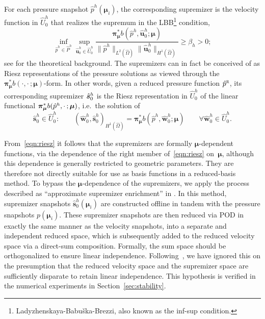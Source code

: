 \documentclass[onecolumn, twoside, a4paper, 11pt]{article}
\begin{document}
For each pressure snapshot $\hat{p}^h(\bm{\mu}_i)$, the corresponding supremizer is the
velocity function in $\hat{U}^h_0$ that realizes the supremum in the
LBB\footnote{Ladyzhenskaya-Babu\v{s}ka-Brezzi, also known as the inf-sup condition.} condition,
%
\begin{equation}
  \label{eqn:lbb}
  \inf_{\hat{p}^h \in \hat{P}^h} \sup_{\hat{\bm u}_0^h \in \hat{U}_0^h}
  \frac{\bm{\pi}^*_{\bm{\mu}}b(\hat{p}^h, \hat{\bm u}^h_0; \bm \mu)}
  {\|\hat{p}^h\|_{L^2(\hat{\Omega})} \|\hat{\bm{u}}_0^h\|_{H^1(\hat{\Omega})}}
  \geq \beta_h > 0;
\end{equation}
%
see \cite{Ballarin2015ssp} for the theoretical background.
%
The supremizers can in fact be conceived of as Riesz representations of the pressure solutions as
viewed through the $\bm{\pi}^*_{\bm{\mu}}b(\cdot,\cdot\,;\bm \mu)$-form. In other words,
given a reduced pressure function $\hat{p}^\textsc{r}$, its corresponding supremizer $\smash[t]{\hat{\bm s}^h_0}$ is
the Riesz representation in $\hat{U}_0^h$ of the linear functional
$\smash[t]{\bm{\pi}^*_{\bm{\mu}}b(\hat{p}^h,\cdot\,; \bm \mu)}$, i.e.~the solution of
%
\begin{equation}
  \label{eqn:riesz}
\hat{\bm s}^h_0\in  \hat{U}^h_0:
\qquad
  \left( \hat{\bm w}^h_0, \hat{\bm s}^h_0 \right)_{H^1(\hat{\Omega})} = \bm{\pi}^*_{\bm{\mu}}b(\hat{p}^h, \hat{\bm w}^h_0; \bm \mu)
  \qquad\forall\hat{\bm w}^h_0 \in \hat{U}^h_0.
\end{equation}
%

From~\eqref{eqn:riesz} it follows that the supremizers are formally $\bm{\mu}$\nobreakdash-dependent functions,
via the dependence of the right member of~\eqref{eqn:riesz} on~$\bm{\mu}$, although this dependence
is generally restricted to geometric parameters. They are therefore not directly suitable for use
as basis functions in a reduced-basis method. To bypass the $\bm{\mu}$\nobreakdash-dependence of the supremizers,
we apply the process described as ``approximate supremizer enrichment'' in
\cite[4.2.3]{Ballarin2015ssp}. In this method, supremizer snapshots $\hat{\bm s}^h_0(\bm\mu_i)$ are constructed
offline in tandem with the pressure snapshots $p(\bm \mu_i)$. These supremizer snapshots are then
reduced via POD in exactly the same manner as the velocity snapshots, into a separate and independent reduced space,
which is subsequently added to the reduced velocity space via a direct-sum composition. Formally,
the sum space should be orthogonalized to ensure linear independence. Following~\cite{Ballarin2015ssp}, we have ignored
this on the presumption that the reduced velocity space and the supremizer space are sufficiently disparate to
retain linear independence. This hypothesis is verified in the numerical experiments in Section~\ref{sec:stability}.
\end{document}
